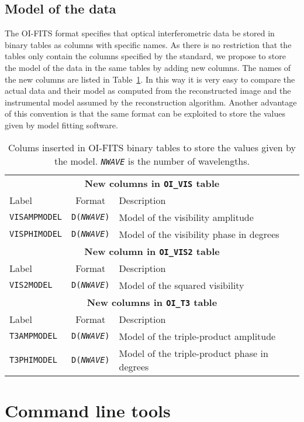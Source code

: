 \documentclass{article}
\newcommand*{\ROW}{} %
\newcommand*{\ROWTITLE}{} %
\begin{document}
\subsection{Model of the data}

The OI-FITS format \citep{Pauls_et_al-2005-oifits} specifies that optical
interferometric data be stored in binary tables as columns with specific
names.  As there is no restriction that the tables only contain the columns
specified by the standard, we propose to store the model of the data in the
same tables by adding new columns.  The names of the new columns are listed in
Table~\ref{tab:model-columns}.  In this way it is very easy to compare the
actual data and their model as computed from the reconstructed image and the
instrumental model assumed by the reconstruction algorithm.  Another advantage
of this convention is that the same format can be exploited to store the
values given by model fitting software.

\renewcommand{\ROW}[2]{\texttt{#1} & \texttt{D(\textsl{NWAVE})} & #2 \\}
\renewcommand{\ROWTITLE}[1]{\multicolumn{3}{c}{\textbf{#1}}\\}

\begin{table}
\caption{Colums inserted in OI-FITS binary tables to store the values given by
the model.  \texttt{\textsl{NWAVE}} is the number of wavelengths.
\label{tab:model-columns}}
\begin{tabular}{lcl}
\hline
\hline
\ROWTITLE{New columns in \texttt{OI\_VIS} table}
Label & Format & Description \\
\hline
\ROW{VISAMPMODEL}{Model of the visibility amplitude}
\ROW{VISPHIMODEL}{Model of the visibility phase in degrees}
\hline
\hline
\ROWTITLE{New column in \texttt{OI\_VIS2} table}
Label & Format & Description \\
\hline
\ROW{VIS2MODEL}{Model of the squared visibility}
\hline
\hline
\ROWTITLE{New columns in \texttt{OI\_T3} table}
Label & Format & Description \\
\hline
\ROW{T3AMPMODEL}{Model of the triple-product amplitude}
\ROW{T3PHIMODEL}{Model of the triple-product phase in degrees}
\hline
\end{tabular}
\end{table}

\section{Command line tools}
\end{document}
